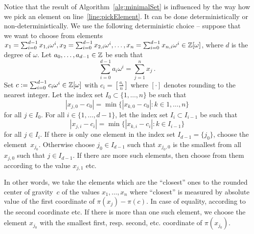 \begin{upravit}
Notice that the result of Algorithm~\ref{alg:minimalSet} is influenced by the way how we pick an element on line~\ref{line:pickElement}. It can be done deterministically or non-deterministically. We use the following deterministic choice -- suppose that we want to choose from elements $x_1=\sum_{i=0}^{d-1}x_{1,i}\omega^i, x_2=\sum_{i=0}^{d-1}x_{2,i}\omega^i, \dots,x_n=\sum_{i=0}^{d-1}x_{n,i}\omega^i\in\mathbb{Z}[\omega]$, where $d$ is the degree of $\omega$. Let $a_0,\dots,a_{d-1}\in\mathbb{Z}$ be such that 
$$
\sum_{i=0}^{d-1}a_i\omega^i=\sum_{j=1}^n x_j\,.
$$ 
Set $c:=\sum_{i=0}^{d-1}c_i\omega^i \in\mathbb{Z}[\omega]$ with $c_i=[\frac{a_i}{n}]$ where $[\cdot]$ denotes rounding to the nearest integer. Let the index set $I_0\subset\{1,\dots,n\}$ be such that 
$$
|x_{j,0}-c_0|=\min\{|x_{k,0}-c_0|\colon k\in{1,\dots,n}\}
$$
for all $j\in I_0$. For all $i\in\{1,\dots,d-1\}$, let the index set $I_i\subset I_{i-1}$ be such that
$$
|x_{j,i}-c_i|=\min\{|x_{k,i}-c_i|\colon k\in I_{i-1}\}
$$
for all $j\in I_i$. If there is only one element in the index set $I_{d-1}=\{j_0\}$, choose the element~$x_{j_0}$. Otherwise choose $j_0\in I_{d-1}$ such that $x_{j_0,0}$ is the smallest from all $x_{j,0}$ such that $j\in I_{d-1}$. If there are more such elements, then choose from them according to the value $x_{j,1}$ etc. 

In other words, we take the elements which are the ``closest'' ones to the rounded center of gravity~$c$ of the values $x_1,\dots,x_n$ where ``closest'' is measured by absolute value of the first coordinate of $\pi(x_j)-\pi(c)$. In case of equality, according to the second coordinate etc. If there is more than one such element, we choose the element $x_{j_0}$ with the smallest first, resp. second, etc. coordinate of $\pi(x_{j_0})$.  
\end{upravit}